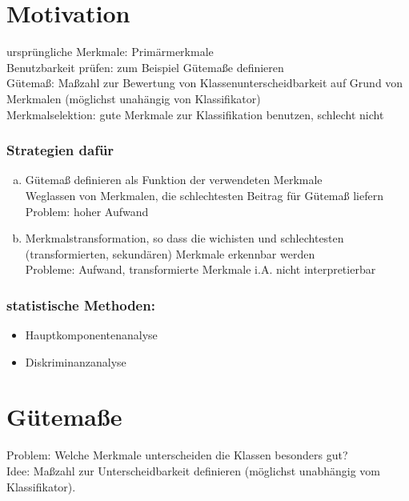 \documentclass[a4paper,12pt]{scrreprt}
\begin{document}
\section{Motivation}
ursprüngliche Merkmale: Primärmerkmale\\
Benutzbarkeit prüfen: zum Beispiel Gütemaße definieren\\
Gütemaß: Maßzahl zur Bewertung von Klassenunterscheidbarkeit auf Grund von Merkmalen (möglichst unahängig von Klassifikator)\\
Merkmalselektion: gute Merkmale zur Klassifikation benutzen, schlecht nicht\\

\subsubsection*{Strategien dafür}

\begin{enumerate}[a)]
 \item Gütemaß definieren als Funktion der verwendeten Merkmale\\
 Weglassen von Merkmalen, die schlechtesten Beitrag für Gütemaß liefern\\
 Problem: hoher Aufwand
 \item Merkmalstransformation, so dass die wichisten und schlechtesten (transformierten, sekundären) Merkmale erkennbar werden\\
 Probleme: Aufwand, transformierte Merkmale i.A. nicht interpretierbar
\end{enumerate}

\subsubsection*{statistische Methoden:}

\begin{itemize}
 \item Hauptkomponentenanalyse
 \item Diskriminanzanalyse
\end{itemize}

\section{Gütemaße}

Problem: Welche Merkmale unterscheiden die Klassen besonders gut?\\
Idee: Maßzahl zur Unterscheidbarkeit definieren (möglichst unabhängig vom Klassifikator).
\end{document}
